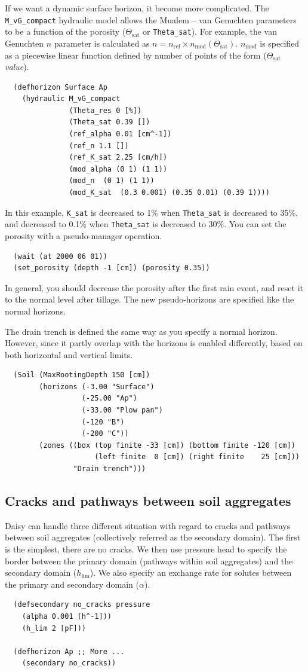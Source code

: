 \documentclass[a4paper]{article}
\begin{document}
If we want a dynamic surface horizon, it become more complicated.  The
\verb|M_vG_compact| hydraulic model allows the Mualem -- van Genuchten
parameters to be a function of the porosity ($\Theta_{\mbox{sat}}$ or
\verb|Theta_sat|).  For example, the van Genuchten $n$ parameter is
calculated as $n = n_{\mbox{ref}} \times n_{\mbox{mod}}
(\Theta_{\mbox{sat}})$.  $n_{\mbox{mod}}$ is specified as a
piecewise linear function defined by number of points of the form
($\Theta_{\mbox{sat}}$ \emph{value}).
\begin{verbatim}
  (defhorizon Surface Ap
    (hydraulic M_vG_compact
               (Theta_res 0 [%])
               (Theta_sat 0.39 [])
               (ref_alpha 0.01 [cm^-1])
               (ref_n 1.1 []) 
               (ref_K_sat 2.25 [cm/h])
               (mod_alpha (0 1) (1 1))
               (mod_n  (0 1) (1 1))
               (mod_K_sat  (0.3 0.001) (0.35 0.01) (0.39 1))))
\end{verbatim}
In this example, \verb|K_sat| is decreased to 1\% when
\verb|Theta_sat| is decreased to 35\%, and decreased to 0.1\% when
\verb|Theta_sat| is decreased to 30\%.  You can set the porosity with
a pseudo-manager operation.
\begin{verbatim}
  (wait (at 2000 06 01))
  (set_porosity (depth -1 [cm]) (porosity 0.35))
\end{verbatim}
In general, you should decrease the porosity after the first rain
event, and reset it to the normal level after tillage.  The new
pseudo-horizons are specified like the normal horizons.

The drain trench is defined the same way as you specify a normal
horizon.  However, since it partly overlap with the horizons is
enabled differently, based on both horizontal and vertical limits.
\begin{verbatim}
  (Soil (MaxRootingDepth 150 [cm])
        (horizons (-3.00 "Surface")
                  (-25.00 "Ap")
                  (-33.00 "Plow pan")
                  (-120 "B")
                  (-200 "C"))
        (zones ((box (top finite -33 [cm]) (bottom finite -120 [cm])
                     (left finite  0 [cm]) (right finite    25 [cm]))
                "Drain trench")))
\end{verbatim}

\subsection{Cracks and pathways between soil aggregates}

Daisy can handle three different situation with regard to cracks and
pathways between soil aggregates (collectively referred as the
secondary domain).  The first is the simplest, there are no cracks.
We then use pressure head to specify the border between the primary
domain (pathways within soil aggregates) and the secondary domain
($h_{\mbox{lim}}$).  We also specify an exchange rate for solutes
between the primary and secondary domain ($\alpha$).
\begin{verbatim}
  (defsecondary no_cracks pressure 
    (alpha 0.001 [h^-1]))  
    (h_lim 2 [pF]))

  (defhorizon Ap ;; More ...
    (secondary no_cracks))
\end{verbatim}
\end{document}
